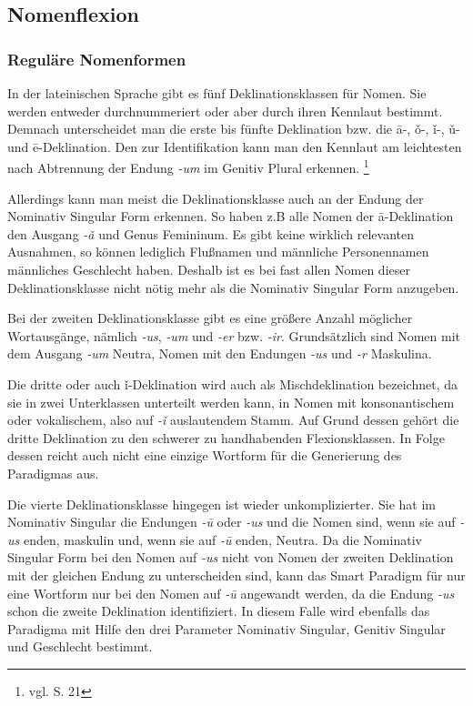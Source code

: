\documentclass[fontsize=12pt,abstract=on,titlepage,bibliography=totoc,ngerman,listof=totoc]{scrreprt}
\begin{document}
\subsection{Nomenflexion}
\label{subsec:nomen}
\subsubsection{Reguläre Nomenformen}
In der lateinischen Sprache gibt es fünf Deklinationsklassen für Nomen. Sie werden entweder durchnummeriert oder aber durch ihren Kennlaut bestimmt. Demnach unterscheidet man die erste bis fünfte Deklination bzw. die ā-, ǒ-, ǐ-, ǔ- und ē-Deklination. Den zur Identifikation kann man den Kennlaut am leichtesten nach Abtrennung der Endung \textit{-um} im Genitiv Plural erkennen. \footnote{vgl. \cite{BAYER-LINDAUER1994} S. 21}\par
Allerdings kann man meist die Deklinationsklasse auch an der Endung der Nominativ Singular Form erkennen. So haben z.B alle Nomen der ā-Deklination den Ausgang \textit{-ǎ} und Genus Femininum. Es gibt keine wirklich relevanten Ausnahmen, so können lediglich Flußnamen und männliche Personennamen männliches Geschlecht haben. Deshalb ist es bei fast allen Nomen dieser Deklinationsklasse nicht nötig mehr als die Nominativ Singular Form anzugeben. \par
Bei der zweiten Deklinationsklasse gibt es eine größere Anzahl möglicher Wortausgänge, nämlich \textit{-us}, \textit{-um} und \textit{-er} bzw. \textit{-ir}. Grundsätzlich sind Nomen mit dem Ausgang \textit{-um} Neutra, Nomen mit den Endungen \textit{-us} und \textit{-r} Maskulina. \par
Die dritte oder auch ǐ-Deklination wird auch als Mischdeklination bezeichnet, da sie in zwei Unterklassen unterteilt werden kann, in Nomen mit konsonantischem oder vokalischem, also auf \textit{-ǐ} auslautendem Stamm. Auf Grund dessen gehört die dritte Deklination zu den schwerer zu handhabenden Flexionsklassen. In Folge dessen reicht auch nicht eine einzige Wortform für die Generierung des Paradigmas aus. \par
Die vierte Deklinationsklasse hingegen ist wieder unkomplizierter. Sie hat im Nominativ Singular die Endungen \textit{-ū} oder \textit{-us} und die Nomen sind, wenn sie auf \textit{-us} enden, maskulin und, wenn sie auf \textit{-ū} enden, Neutra. Da die Nominativ Singular Form bei den Nomen auf \textit{-us} nicht von Nomen der zweiten Deklination mit der gleichen Endung zu unterscheiden sind, kann das Smart Paradigm für nur eine Wortform nur bei den Nomen auf \textit{-ū} angewandt werden, da die Endung \textit{-us} schon die zweite Deklination identifiziert. In diesem Falle wird ebenfalls das Paradigma mit Hilfe den drei Parameter Nominativ Singular, Genitiv Singular und Geschlecht bestimmt. \par
\end{document}
